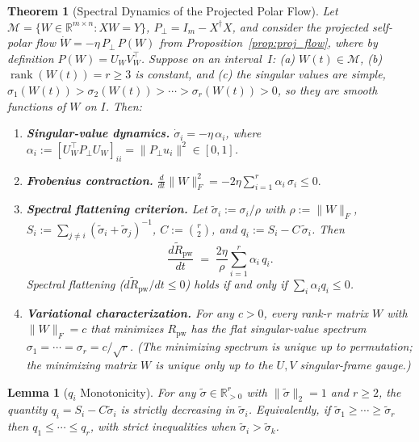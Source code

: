 \documentclass{article}
\newtheorem{theorem}{Theorem}
\newtheorem{lemma}{Lemma}
\begin{document}
\begin{theorem}[Spectral Dynamics of the Projected Polar Flow]
\label{thm:thmA}
Let $\mathcal{M}=\{W\in\mathbb{R}^{m\times n}:XW=Y\}$, $P_\perp=I_m-X^\dagger X$, and consider the projected self-polar flow $\dot W = -\eta\,P_\perp\,P(W)$ from Proposition~\ref{prop:proj_flow}, where by definition $P(W)=U_W V_W^\top$. Suppose on an interval~$I$: (a) $W(t)\in\mathcal{M}$, (b) $\operatorname{rank}(W(t))=r\geq 3$ is constant, and (c) the singular values are simple, $\sigma_1(W(t))>\sigma_2(W(t))>\cdots>\sigma_r(W(t))>0$, so they are smooth functions of $W$ on $I$. Then:
\begin{enumerate}[label=\textup{(\roman*)}]
\item \textbf{Singular-value dynamics.}\;
  $\dot{\sigma}_i = -\eta\,\alpha_i$, where $\alpha_i := [U_W^\top P_\perp U_W]_{ii} = \|P_\perp u_i\|^2 \in[0,1]$.

\item \textbf{Frobenius contraction.}\;
  $\displaystyle\frac{d}{dt}\|W\|_F^2 = -2\eta\sum_{i=1}^{r}\alpha_i\,\sigma_i \leq 0.$

\item \textbf{Spectral flattening criterion.}\;
  Let $\widetilde{\sigma}_i := \sigma_i/\rho$ with $\rho:=\|W\|_F$, $S_i := \sum_{j\neq i}(\widetilde{\sigma}_i+\widetilde{\sigma}_j)^{-1}$, $C := \binom{r}{2}$, and $q_i := S_i - C\,\widetilde{\sigma}_i$. Then
  \begin{equation}\label{eq:sign_criterion}
    \frac{d\widetilde{R}_{\mathrm{pw}}}{dt} \;=\; \frac{2\eta}{\rho}\sum_{i=1}^{r}\alpha_i\,q_i.
  \end{equation}
  Spectral flattening ($d\widetilde{R}_{\mathrm{pw}}/dt \leq 0$) holds if and only if $\sum_i \alpha_i q_i \leq 0$.

\item \textbf{Variational characterization.}\;
  For any $c>0$, every rank-$r$ matrix $W$ with $\|W\|_F=c$ that minimizes $R_{\mathrm{pw}}$ has the flat singular-value spectrum $\sigma_1=\cdots=\sigma_r=c/\!\sqrt r$. (The minimizing \emph{spectrum} is unique up to permutation; the minimizing \emph{matrix} $W$ is unique only up to the $U,V$ singular-frame gauge.)
\end{enumerate}
\end{theorem}

\begin{lemma}[$q_i$ Monotonicity]
\label{lem:q_monotone}
For any $\widetilde\sigma\in\mathbb R^r_{>0}$ with $\|\widetilde\sigma\|_2=1$ and $r\geq 2$, the quantity $q_i=S_i-C\widetilde\sigma_i$ is strictly decreasing in $\widetilde\sigma_i$. Equivalently, if $\widetilde\sigma_1\geq\cdots\geq\widetilde\sigma_r$ then $q_1\leq\cdots\leq q_r$, with strict inequalities when $\widetilde\sigma_i>\widetilde\sigma_k$.
\end{lemma}
\end{document}
